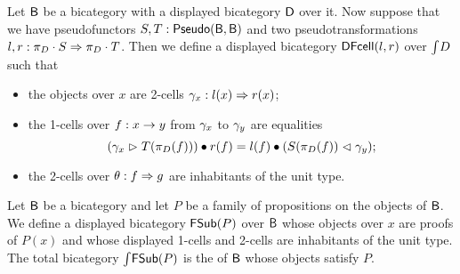 \begin{example}
\label{ex:DCell}
Let $\mathsf{B}$ be a bicategory with a displayed bicategory $\mathsf{D}$ over it.
Now suppose that we have pseudofunctors $S, T : \mathsf{Pseudo}(\mathsf{B}, \mathsf{B})$ and two pseudotransformations $l, r : \pi_{D} \cdot S \Rightarrow \pi_{D} \cdot T$.
Then we define a displayed bicategory $\mathsf{DFcell}(l,r)$ over $\textstyle \int_{}{D}$ such that
\begin{itemize}
	\item the objects over $x$ are 2-cells $\gamma_x : l(x) \Rightarrow r(x)$;
	\item the 1-cells over $f : x \rightarrow y$ from $\gamma_x$ to $\gamma_y$ are equalities
	\[
	(\gamma_x \vartriangleright T(\pi_{D}(f))) \bullet r(f)
	=
	l(f) \bullet (S(\pi_{D}(f)) \vartriangleleft \gamma_y);
	\]
	\item the 2-cells over $\theta : f \Rightarrow g$ are inhabitants of the unit type.
\end{itemize}
\end{example}

\begin{example}
\label{ex:fullsub}
Let $\mathsf{B}$ be a bicategory and let $P$ be a family of propositions on the objects of $\mathsf{B}$.
We define a displayed bicategory $\mathsf{FSub}(P)$ over $\mathsf{B}$ whose objects over $x$ are proofs of $P(x)$
and whose displayed 1-cells and 2-cells are inhabitants of the unit type.
The total bicategory $\textstyle \int_{}{\mathsf{FSub}(P)}$ is the  of $\mathsf{B}$ whose objects satisfy $P$.
\end{example}
